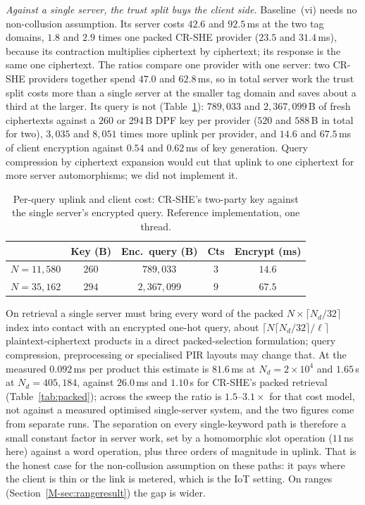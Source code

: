 \documentclass[11pt,a4paper]{article}
\newcommand{\mref}[1]{\ref{M-#1}}
\newlength{\tblwidth}\setlength{\tblwidth}{\linewidth}
\begin{document}
\emph{Against a single server, the trust split buys the client side.}
Baseline~(vi) needs no non-collusion assumption. Its server costs $42.6$ and
$92.5$\,ms at the two tag domains, $1.8$ and $2.9$ times one packed CR-SHE
provider ($23.5$ and $31.4$\,ms), because its contraction multiplies ciphertext
by ciphertext; its response is the same one ciphertext. The ratios compare one
provider with one server: two CR-SHE providers together spend $47.0$ and
$62.8$\,ms, so in total server work the trust split costs more than a single
server at the smaller tag domain and saves about a third at the larger. Its query is not (Table~\ref{tab:uplink}):
$789{,}033$ and $2{,}367{,}099$\,B of fresh ciphertexts against a $260$ or
$294$\,B DPF key per provider ($520$ and $588$\,B in total for two),
$3{,}035$ and $8{,}051$ times more uplink per provider, and $14.6$ and
$67.5$\,ms of client encryption against $0.54$ and $0.62$\,ms of key
generation. Query compression by ciphertext expansion \citep{angel2018pir}
would cut that uplink to one ciphertext for more server automorphisms; we did
not implement it.

\begin{table}[htbp]
\caption{Per-query uplink and client cost: CR-SHE's two-party key against the
single server's encrypted query. Reference implementation, one thread.}
\label{tab:uplink}
\centering
\footnotesize
\setlength{\tabcolsep}{3pt}
\begin{tabular*}{\tblwidth}{@{\extracolsep{\fill}}lcccc@{}}
\toprule
 & Key (B) & Enc.\ query (B) & Cts & Encrypt (ms) \\
\midrule
$N=11{,}580$ & $260$ & $789{,}033$ & $3$ & $14.6$ \\
$N=35{,}162$ & $294$ & $2{,}367{,}099$ & $9$ & $67.5$ \\
\bottomrule
\end{tabular*}
\end{table}

On retrieval a single server must bring every word of the packed
$N\times\lceil N_d/32\rceil$ index into contact with an encrypted one-hot
query, about $\lceil N\lceil N_d/32\rceil/\ell\rceil$ plaintext-ciphertext
products in a direct packed-selection formulation; query compression,
preprocessing or specialised PIR layouts may change that. At the measured
$0.092$\,ms per product this estimate is $81.6$\,ms at
$N_d=2\times10^4$ and $1.65$\,s at $N_d=405{,}184$, against $26.0$\,ms and
$1.10$\,s for CR-SHE's packed retrieval (Table~\ref{tab:packed}); across the
sweep the ratio is $1.5$--$3.1\times$ for that cost model, not against a
measured optimised single-server system, and the two figures come from separate
runs. The separation on every single-keyword path is therefore a small constant
factor in server work, set by a homomorphic slot operation ($11$\,ns here)
against a word operation, plus three orders of magnitude in uplink. That is the
honest case for the non-collusion assumption on these paths: it pays where the
client is thin or the link is metered, which is the IoT setting. On ranges
(Section~\mref{sec:rangeresult}) the gap is wider.
\end{document}
